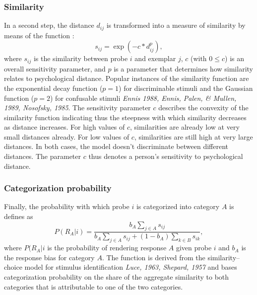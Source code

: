 \documentclass[a4paper,man,natbib]{apa6}
\begin{document}
\subsubsection{Similarity}
In a second step, the distance $d_{ij}$ is transformed into a measure of similarity by means of the function \citep{nosofsky1986attention}:
\begin{equation}
s_{ij} = \exp\left(-c*d_{ij}^p\right),
\end{equation}
where $s_{ij}$ is the similarity between probe $i$ and exemplar $j$, $c$ (with $0 \leq c$) is an overall sensitivity parameter, and $p$ is a parameter that determines how similarity relates to psychological distance. Popular instances of the similarity function are the exponential decay function ($p = 1$) for discriminable stimuli and the Gaussian function ($p = 2$) for confusable stimuli \textit{Ennis 1988, Ennis, Palen, & Mullen, 1989, Nosofsky, 1985}. The sensitivity parameter $c$ describes the convexity of the similarity function indicating thus the steepness with which similarity decreases as distance increases. For high values of $c$, similarities are already low at very small distances already. For low values of $c$, similarities are still high at very large distances. In both cases, the model doesn't discriminate between different distances. The parameter $c$ thus denotes a person's sensitivity to psychological distance.

\subsubsection{Categorization probability}
Finally, the probability with which probe $i$ is categorized into category $A$ is defines as 
\begin{equation}
P(R_{A}|i) = \frac{b_{A}\sum\limits_{j \in A} s_{ij}}{b_{A}\sum\limits_{j \in A} s_{ij} + (1 - b_{A})\sum\limits_{k \in B} s_{ik}},
\end{equation}
where $P(R_{A}|i$ is the probability of rendering response $A$ given probe $i$ and $b_{A}$ is the response bias for category $A$. The function is derived from the similarity--choice model for stimulus identification \textit{Luce, 1963, Shepard, 1957} and bases categorization probability on the share of the aggregate similarity to both categories that is attributable to one of the two categories.
\end{document}
